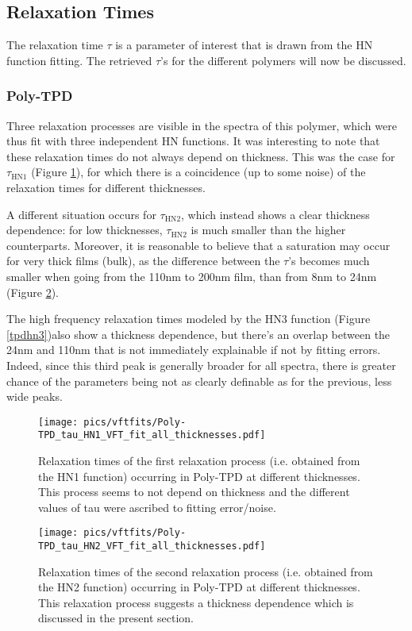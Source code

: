 \subsection{Relaxation Times}
The relaxation time $\tau$ is a parameter of interest that is drawn from the HN function fitting. The retrieved $\tau$'s for the different polymers will now be discussed.
\subsubsection{Poly-TPD}
Three relaxation processes are visible in the spectra of this polymer, which were thus fit with three independent HN functions. It was interesting to note that these relaxation times do not always depend on thickness.
This was the case for $\tau_{\text{HN1}}$ (Figure \ref{tpdhn1}), for which there is a coincidence (up to some noise) of the relaxation times for different thicknesses.

A different situation occurs for $\tau_{\text{HN2}}$, which instead shows a clear thickness dependence: for low thicknesses, $\tau_{\text{HN2}}$ is much smaller than the higher counterparts. Moreover, it is reasonable to believe that a saturation may occur for very thick films (bulk), as the difference between the $\tau$'s becomes much smaller when going from the 110nm to 200nm film, than from 8nm to 24nm (Figure \ref{tpdhn2}).

The high frequency relaxation times modeled by the HN3 function (Figure \ref{tpdhn3})also show a thickness dependence, but there's an overlap between the 24nm and 110nm that is not immediately explainable if not by fitting errors. Indeed, since this third peak is generally broader for all spectra, there is greater chance of the parameters being not as clearly definable as for the previous, less wide peaks.

\begin{figure}[t]%
  \centering
  \texttt{[image: pics/vftfits/Poly-TPD\_tau\_HN1\_VFT\_fit\_all\_thicknesses.pdf]}
  \caption{Relaxation times of the first relaxation process (i.e. obtained from the HN1 function) occurring in Poly-TPD at different thicknesses. This process seems to not depend on thickness and the different values of tau were ascribed to fitting error/noise.}
  \label{tpdhn1}
\end{figure}%

\begin{figure}[t]%
  \centering
  \texttt{[image: pics/vftfits/Poly-TPD\_tau\_HN2\_VFT\_fit\_all\_thicknesses.pdf]}
  \caption{Relaxation times of the second relaxation process (i.e. obtained from the HN2 function) occurring in Poly-TPD at different thicknesses. This relaxation process suggests a thickness dependence which is discussed in the present section.}
  \label{tpdhn2}
\end{figure}%

